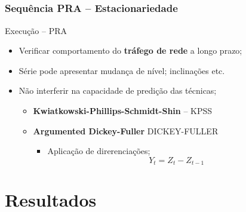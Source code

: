 \documentclass[aspectratio=169]{beamer}
\begin{document}
\subsection{}
\begin{frame}
\frametitle{Sequência PRA -- Estacionariedade}
\begin{block}{Execução -- PRA}\onehalfspacing
    \begin{itemize}
        \item Verificar comportamento do \textbf{tráfego de rede} a longo prazo;
        \item Série pode apresentar mudança de nível; inclinações etc.
        \item Não interferir na capacidade de predição das técnicas;
            \begin{itemize}[triangle]
                \item \textbf{Kwiatkowski-Phillips-Schmidt-Shin} -- KPSS
                \item \textbf{Argumented Dickey-Fuller} DICKEY-FULLER
                    \begin{itemize}[square]
                    \item Aplicação de direrenciações;
                        \begin{equation}
                             Y_{t} = Z_{t} - Z_{t-1}
                         \end{equation}
                    \end{itemize}
            \end{itemize}
        \end{itemize}
\end{block}
\end{frame}

\section{Resultados}

\end{document}
